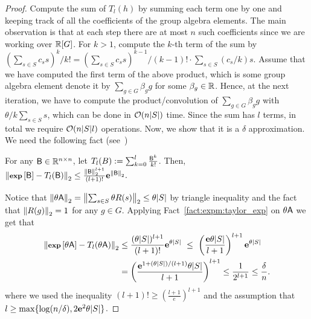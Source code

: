 \begin{proof}
Compute the sum of $T_l(h)$ by summing each term one by one and keeping track of all the coefficients of the group algebra elements. The main observation is that at each step there are at most $n$ such coefficients since we are working over $\mathbb{R} [G]$. For $k > 1$, compute the $k$-th term of the sum by $(\sum_{s\in S} c_s s)^k /k! = (\sum_{s\in S} c_s s)^{k - 1 }/(k - 1 )! \cdot \sum_{s\in S} (c_s/k) s.$
	Assume that we have computed the first term of the above product, which is some group algebra element denote it by $\sum_{g\in G} \beta_g g$ for some $\beta_g\in\mathbb{R}$. Hence, at the next iteration, we have to compute the product/convolution of $\sum_{g\in G} \beta_g g$ with $\theta /k \sum_{s\in S} s$, which can be done in  $\mathcal{O}( n |S|)$ time. Since the sum has $l$ terms, in total we require $\mathcal{O}(n|S| l)$ operations. Now, we show that it is a $\delta$ approximation. We need the following fact (see~\cite[Theorem~$10.1$,~p.~$234$]{book:Higham:Matrix_fcn})
\begin{fact}\label{fact:expm:taylor_exp}
For any ${\mathsf{B} }\in \mathbb{R}^{n\times n}$, let $T_{l}(B) := \sum_{k=0}^{l} \frac{{\mathsf{B} }^k}{k!}$. Then, $ \left\| \operatorname{\textbf{\footnotesize exp}}\left[{\mathsf{B} }\right] - T_{l}({\mathsf{B} }) \right\|_2 \leq \frac{\left\|{\mathsf{B} }\right\|_2^{l+1}}{(l+1)!} {\mathbf e}^{\left\|{\mathsf{B} }\right\|_2}.$
\end{fact}
%
Notice that $ \left\|\theta {\ensuremath{\mathsf{A} }}\right\|_2 = \left\|\sum_{s\in S}\theta R(s)\right\|_2 \leq \theta |S|$ by triangle inequality and the fact that $\left\|R(g)\right\|_2=1$ for any $g\in G$. Applying Fact~\ref{fact:expm:taylor_exp} on $\theta {\ensuremath{\mathsf{A} }}$ we get that
	\begin{align*}
		\norm{\expm{\theta \matA} - T_l(\theta \matA)}	& \leq  \frac{(\theta |S|)^{l+1}}{(l+1)!}\e^{\theta |S|}\ \leq\ \left(\frac{ \e\theta |S|}{l+1}\right)^{l+1} \e^{\theta |S|} \\
									&   =  \left(\frac{ \e^{1+ (\theta |S|)/(l+1)}\theta |S|}{l+1}\right)^{l+1}  \leq \frac1{2^{l+1}} \leq \frac{\delta}{n}.
	\end{align*}
	where we used the inequality $(l+1)! \geq  (\frac{l+1}{e})^{l+1}$ and the assumption that $l\geq \max\{ \log (n/\delta) , 2 {\mathbf e}^2 \theta |S|\}$.
\end{proof}
%

